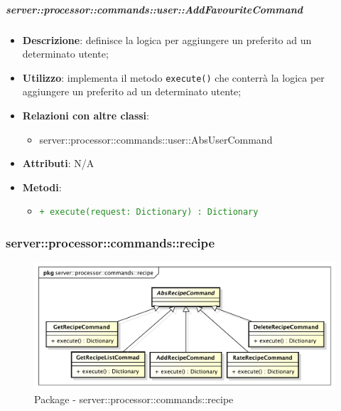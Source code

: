         \subparagraph{server::processor::commands::user::AddFavouriteCommand} %
        \label{subp:bdsm_app_server_processor_commands_user_addfavouritecommand}
        \begin{itemize}
          \item \textbf{Descrizione}: definisce la logica per aggiungere un preferito ad un determinato utente;
          \item \textbf{Utilizzo}: implementa il metodo \texttt{execute()} che conterrà la logica per aggiungere un preferito ad un determinato utente;
          \item \textbf{Relazioni con altre classi}:
            \begin{itemize}
              \item server::processor::commands::user::AbsUserCommand
            \end{itemize}
          \item \textbf{Attributi}: N/A
          \item \textbf{Metodi}:
          \begin{itemize}
              \item \textcolor{forestgreen}{\texttt{+ execute(request: Dictionary) : Dictionary}}
          \end{itemize}
        \end{itemize}


      \subsubsection{server::processor::commands::recipe} %
      \label{ssub:bdsm_app_server_processor_commands_recipe}
      \begin{figure}[!htbp]
        \centering
        \centerline{\includegraphics[scale=0.5]{./images/server/recipe.pdf}}
        \caption{Package - server::processor::commands::recipe}
      \end{figure}

